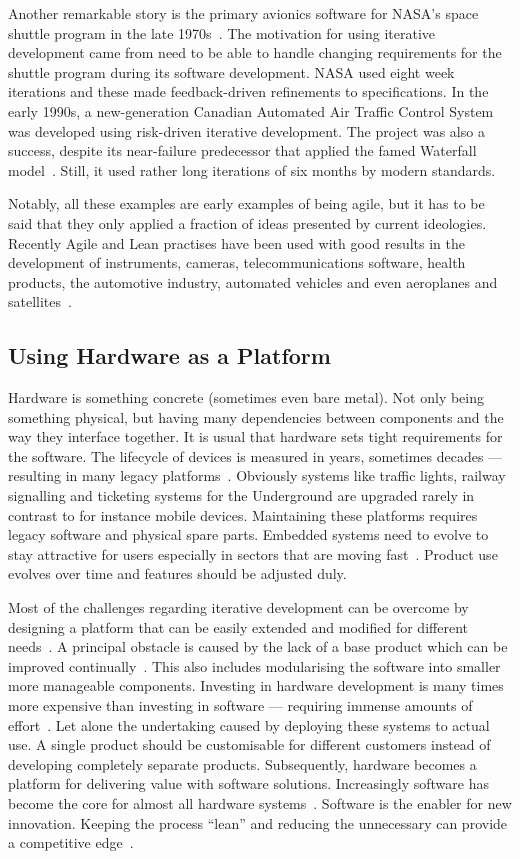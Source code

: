 \documentclass[english]{tktltiki2}
\begin{document}
Another remarkable story is the primary avionics software for NASA’s space shuttle program in the late 1970s~\cite{LB03}. The motivation for using iterative development came from need to be able to handle changing requirements for the shuttle program during its software development. NASA used eight week iterations and these made feedback-driven refinements to specifications. In the early 1990s, a new-generation Canadian Automated Air Traffic Control System was developed using risk-driven iterative development. The project was also a success, despite its near-failure predecessor that applied the famed Waterfall model~\cite{LB03}. Still, it used rather long iterations of six months by modern standards.

Notably, all these examples are early examples of being agile, but it has to be said that they only applied a fraction of ideas presented by current ideologies. Recently Agile and Lean practises have been used with good results in the development of instruments, cameras, telecommunications software, health products, the automotive industry, automated vehicles and even aeroplanes and satellites~\cite{RA03, VB09, BE12, KRM13, HB14}.

\subsection{Using Hardware as a Platform}

Hardware is something concrete (sometimes even bare metal). Not only being something physical, but having many dependencies between components and the way they interface together. It is usual that hardware sets tight requirements for the software. The lifecycle of devices is measured in years, sometimes decades — resulting in many legacy platforms~\cite{BE12}. Obviously systems like traffic lights, railway signalling and ticketing systems for the Underground are upgraded rarely in contrast to for instance mobile devices. Maintaining these platforms requires legacy software and physical spare parts. Embedded systems need to evolve to stay attractive for users especially in sectors that are moving fast~\cite{BE12}. Product use evolves over time and features should be adjusted duly.

Most of the challenges regarding iterative development can be overcome by designing a platform that can be easily extended and modified for different needs~\cite{KRM13}. A principal obstacle is caused by the lack of a base product which can be improved continually~\cite{HAB12}. This also includes modularising the software into smaller more manageable components. Investing in hardware development is many times more expensive than investing in software — requiring immense amounts of effort~\cite{BE12}. Let alone the undertaking caused by deploying these systems to actual use. A single product should be customisable for different customers instead of developing completely separate products. Subsequently, hardware becomes a platform for delivering value with software solutions. Increasingly software has become the core for almost all hardware systems~\cite{BE12}. Software is the enabler for new innovation. Keeping the process “lean” and reducing the unnecessary can provide a competitive edge~\cite{CWR10}.
\end{document}
